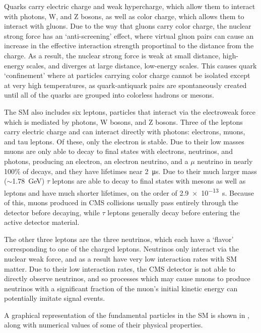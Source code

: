 Quarks carry electric charge and weak hypercharge, which allow them to interact with photons, W, and Z bosons, as well as color charge, which allows them to interact with gluons. 
Due to the way that gluons carry color charge, the nuclear strong force has an `anti-screening' effect, where virtual gluon pairs can cause an increase in the effective interaction strength proportinal to the distance from the charge. 
As a result, the nuclear strong force is weak at small distance, high-energy scales, and diverges at large distance, low-energy scales. 
This causes quark `confinement' where at particles carrying color charge cannot be isolated except at very high temperatures, as quark-antiquark pairs are spontaneously created until all of the quarks are grouped into colorless hadrons or mesons.

The SM also includes six leptons, particles that interact via the electroweak force which is mediated by photons, W bosons, and Z bosons.
Three of the leptons carry electric charge and can interact directly with photons: electrons, muons, and tau leptons.
Of these, only the electron is stable.
Due to their low masses muons are only able to decay to final states with electrons, neutrinos, and photons, producing an electron, an electron neutrino, and a $\mu$ neutrino in nearly 100$\%$ of decays, and they have lifetimes near \SI{2}{\micro\second}.
Due to their much larger mass ($\sim$\SI{1.78}{\giga\eV}) $\tau$ leptons are able to decay to final states with mesons as well as leptons and have much shorter lifetimes, on the order of \SI{2.9e-13}{\second}.
Because of this, muons produced in CMS collisions usually pass entirely through the detector before decaying, while $\tau$ leptons generally decay before entering the active detector material.

The other three leptons are the three neutrinos, which each have a `flavor' corresponding to one of the charged leptons.
Neutrinos only interact via the nuclear weak force, and as a result have very low interaction rates with SM matter.
Due to their low interaction rates, the CMS detector is not able to directly observe neutrinos, and so processes which may cause muons to produce neutrinos with a significant fraction of the muon's initial kinetic energy can potentially imitate signal events.

A graphical representation of the fundamental particles in the SM is shown in , along with numerical values of some of their physical properties.

